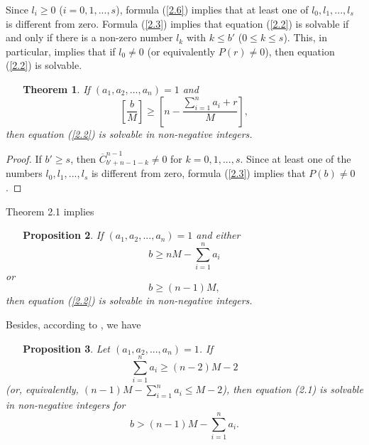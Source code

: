 \documentclass[12pt,reqno,intlim]{amsart}
\numberwithin{equation}{section}
\newtheorem{theo}{\ \ \ Theorem}[section]
\newtheorem{prop}[theo]{\ \ \ Proposition}
\theoremstyle{definition}
\theoremstyle{remark}
\begin{document}
Since $l_i\geq 0$ ($i=0,1,...,s$), formula (\ref{2.6}) implies that at least one of $l_0,l_1,...,l_s$ is different from zero. Formula (\ref{2.3}) implies that equation (\ref{2.2}) is solvable if and only if there is a non-zero number $l_k$ with $k\leq b'$ ($0\leq k\leq s$). This, in particular, implies that if $l_0\neq 0$ (or equivalently $P(r)\neq 0$), then equation (\ref{2.2}) is solvable.

\begin{theo}
If $(a_1,a_2,...,a_n)=1$ and
\begin{equation}
\left[\frac{b}{M}\right]\geq \left[n-\frac{\sum_{i=1}^{n}a_i+r}{M}\right],
\end{equation}
then equation (\ref{2.2}) is solvable in non-negative integers.
\end{theo}

\begin{proof}
If $b'\geq s$, then $\overline{C}_{b'+n-1-k}^{n-1}\neq 0$ for $k=0,1,...,s$. Since at least one of the numbers $l_0,l_1,...,l_s$ is different from zero, formula (\ref{2.3}) implies that $P(b)\neq 0$.
\end{proof}

Theorem 2.1 implies 
\begin{prop}
If $(a_1,a_2,...,a_n)=1$ and either
$$b\geq nM-\sum_{i=1}^{n}a_i$$
 or 
$$b\geq (n-1)M,$$
then equation (\ref{2.2}) is solvable in non-negative integers.
\end{prop}




Besides, according to \cite{S}, we have
\begin{prop}
Let $(a_1,a_2,...,a_n)=1$. If 
$$\sum_{i=1}^{n}a_i\geq (n-2)M-2$$
(or, equivalently, $(n-1)M-\sum_{i=1}^{n}a_i\leq M-2$), then equation (2.1) is solvable in non-negative integers for
\begin{equation} \label{2.10.10}
b>(n-1)M-\sum_{i=1}^{n}a_i.
\end{equation}
\end{prop}
\end{document}
